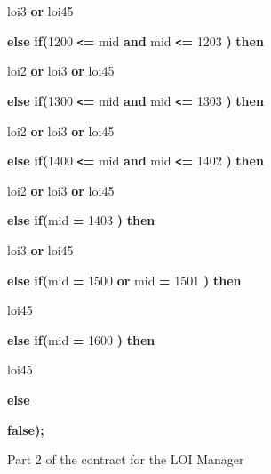 \begin{figure}
{{\parindent=14pt
loi3 {\color{color18} \textbf{or}} loi45  

\parindent=0pt
{\color{color18} \textbf{else}} {\color{color18} \textbf{if(}}1200 {\color{color18} \textbf{\texttt{<}=}} 
mid {\color{color18} \textbf{and}} mid {\color{color18} \textbf{\texttt{<}=}} 1203{\color{color18} \textbf{)}} 
{\color{color18} \textbf{then}}     

\parindent=14pt
loi2 {\color{color18} \textbf{or}} loi3 {\color{color18} \textbf{or}} loi45  

\parindent=0pt
{\color{color18} \textbf{else}} {\color{color18} \textbf{if(}}1300 {\color{color18} \textbf{\texttt{<}=}} 
mid {\color{color18} \textbf{and}} mid {\color{color18} \textbf{\texttt{<}=}} 1303{\color{color18} \textbf{)}} 
{\color{color18} \textbf{then    }}

\parindent=14pt
loi2 {\color{color18} \textbf{or}} loi3 {\color{color18} \textbf{or}} loi45  

\parindent=0pt
{\color{color18} \textbf{else}} {\color{color18} \textbf{if(}}1400 {\color{color18} \textbf{\texttt{<}=}} 
mid {\color{color18} \textbf{and}} mid {\color{color18} \textbf{\texttt{<}=}} 1402{\color{color18} \textbf{)}} 
{\color{color18} \textbf{then    }}

\parindent=14pt
loi2 {\color{color18} \textbf{or}} loi3 {\color{color18} \textbf{or}} loi45  

\parindent=0pt
{\color{color18} \textbf{else}} {\color{color18} \textbf{if(}}mid {\color{color18} \textbf{=}} 
1403{\color{color18} \textbf{)}} {\color{color18} \textbf{then    }}

\parindent=10pt
loi3 {\color{color18} \textbf{or}} loi45  

\parindent=0pt
{\color{color18} \textbf{else}} {\color{color18} \textbf{if(}}mid {\color{color18} \textbf{=}} 
1500 {\color{color18} \textbf{or}} mid {\color{color18} \textbf{=}} 1501{\color{color18} \textbf{)}} 
{\color{color18} \textbf{then    }}

\parindent=14pt
loi45  

\parindent=0pt
{\color{color18} \textbf{else}} {\color{color18} \textbf{if(}}mid {\color{color18} \textbf{=}} 
1600{\color{color18} \textbf{)}} {\color{color18} \textbf{then    }}

\parindent=14pt
loi45  

\parindent=0pt
{\color{color18} \textbf{else}}     

{\color{color18} \textbf{false);         }}

}%
}
\caption{Part 2 of the contract for the LOI Manager}
\label{fig:loi-contract2}
\end{figure}

